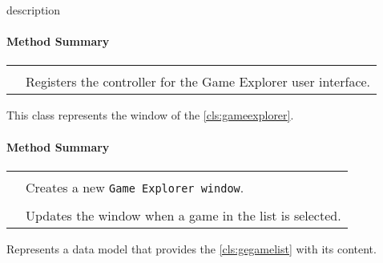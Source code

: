 \pagebreak

description \\

\centerdash

\paragraph*{Method Summary}
\paragraph*{}
\begin{longtable}{Lp{10cm}}
	\startmethodtable
	 \\
	& Registers the controller for the Game Explorer user interface. \\
	\hline
\end{longtable}

\pagebreak

This class represents the window of the \ref{cls:gameexplorer}. \\

\centerdash

\paragraph*{Method Summary}
\paragraph*{}
\begin{longtable}{Lp{10cm}}
	\startmethodtable
	 \\
	& Creates a new \texttt{Game Explorer window}. \\
	 \\
	& Updates the window when a game in the list is selected. \\
	\hline
\end{longtable}

\pagebreak

Represents a data model that provides the \ref{cls:gegamelist} with its content. \\

\centerdash


